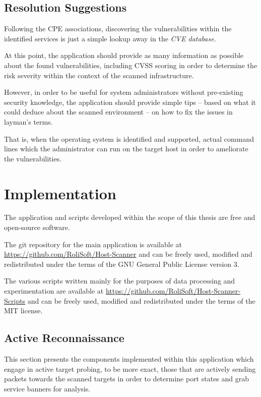 \documentclass[a4paper,12pt]{article}
\begin{document}
\subsection{Resolution Suggestions}
 
	
	Following the CPE associations, discovering the vulnerabilities within the identified services is just a simple lookup away in the \textit{CVE database}.
	
	At this point, the application should provide as many information as possible about the found vulnerabilities, including CVSS scoring in order to determine the risk severity within the context of the scanned infrastructure.
	
	However, in order to be useful for system administrators without pre-existing security knowledge, the application should provide simple tips -- based on what it could deduce about the scanned environment -- on how to fix the issues in layman's terms.
	
	That is, when the operating system is identified and supported, actual command lines which the administrator can run on the target host in order to ameliorate the vulnerabilities.
	
\section{Implementation}
 

	The application and scripts developed within the scope of this thesis are free and open-source software.
	
	The git repository for the main application is available at \url{https://github.com/RoliSoft/Host-Scanner} and can be freely used, modified and redistributed under the terms of the GNU General Public License version 3\cite{gplv3}.
		
	The various scripts written mainly for the purposes of data processing and experimentation are available at \url{https://github.com/RoliSoft/Host-Scanner-Scripts} and can be freely used, modified and redistributed under the terms of the MIT license\cite{mit}.

\subsection{Active Reconnaissance}
 

	This section presents the components implemented within this application which engage in active target probing, to be more exact, those that are actively sending packets towards the scanned targets in order to determine port states and grab service banners for analysis.
	
\end{document}
